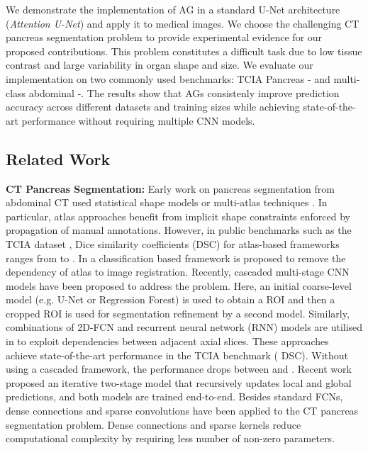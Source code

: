 \documentclass{article}
\begin{document}
We demonstrate the implementation of AG in a standard U-Net architecture (\emph{Attention U-Net}) and apply it to medical images. We choose the challenging CT pancreas segmentation problem to provide experimental evidence for our proposed contributions. This problem constitutes a difficult task due to low tissue contrast and large variability in organ shape and size. We evaluate our implementation on two commonly used benchmarks: TCIA Pancreas - \cite{tciapancreas} and multi-class abdominal -. The results show that AGs consistenly improve prediction accuracy across different datasets and training sizes while achieving state-of-the-art performance without requiring multiple CNN models. 

\vspace{-1.0 mm}
\subsection{Related Work}
\textbf{CT Pancreas Segmentation:} Early work on pancreas segmentation from abdominal CT used statistical shape models \cite{cerrolaza2016soft, saito2016joint} or multi-atlas techniques \cite{oda20173d, wolz2013automated}. In particular, atlas approaches benefit from implicit shape constraints enforced by propagation of manual annotations. However, in public benchmarks such as the TCIA dataset \cite{tciapancreas}, Dice similarity coefficients (DSC) for atlas-based frameworks ranges from  to  \cite{oda20173d, wolz2013automated}. In \cite{zografos2015hierarchical} a classification based framework is proposed to remove the dependency of atlas to image registration. Recently, cascaded multi-stage CNN models \cite{roth2018media, roth2017hierarchical, zhou2017fixed} have been proposed to address the problem. Here, an initial coarse-level model (e.g. U-Net or Regression Forest) is used to obtain a ROI and then a cropped ROI is used for segmentation refinement by a second model. Similarly, combinations of 2D-FCN and recurrent neural network (RNN) models are utilised in \cite{cai2017improving} to exploit dependencies between adjacent axial slices. These approaches achieve state-of-the-art performance in the TCIA benchmark ( DSC). Without using a cascaded framework, the performance drops between  and . Recent work \cite{yu2017saliency} proposed an iterative two-stage model that recursively updates local and global predictions, and both models are trained end-to-end. Besides standard FCNs, dense connections \cite{gibson2017towards} and sparse convolutions \cite{heinrich2018ternarynet, heinrich2017briefnet} have been applied to the CT pancreas segmentation problem. Dense connections and sparse kernels reduce computational complexity by requiring less number of non-zero parameters. 
\end{document}
